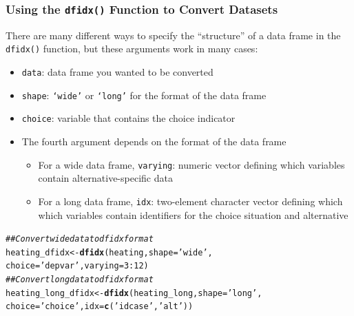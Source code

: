 \documentclass{beamer}\usepackage[]{graphicx}\usepackage[]{color}
\makeatletter
\newcommand{\hlnum}[1]{\textcolor[rgb]{0.686,0.059,0.569}{#1}}%
\newcommand{\hlstr}[1]{\textcolor[rgb]{0.192,0.494,0.8}{#1}}%
\newcommand{\hlcom}[1]{\textcolor[rgb]{0.678,0.584,0.686}{\textit{#1}}}%
\newcommand{\hlopt}[1]{\textcolor[rgb]{0,0,0}{#1}}%
\newcommand{\hlstd}[1]{\textcolor[rgb]{0.345,0.345,0.345}{#1}}%
\newcommand{\hlkwb}[1]{\textcolor[rgb]{0.69,0.353,0.396}{#1}}%
\newcommand{\hlkwc}[1]{\textcolor[rgb]{0.333,0.667,0.333}{#1}}%
\newcommand{\hlkwd}[1]{\textcolor[rgb]{0.737,0.353,0.396}{\textbf{#1}}}%
\newenvironment{kframe}{%
 \def\at@end@of@kframe{}%
 \ifinner\ifhmode%
  \def\at@end@of@kframe{\end{minipage}}%
  \begin{minipage}{\columnwidth}%
 \fi\fi%
 \def\FrameCommand##1{\hskip\@totalleftmargin \hskip-\fboxsep
 \colorbox{shadecolor}{##1}\hskip-\fboxsep
     \hskip-\linewidth \hskip-\@totalleftmargin \hskip\columnwidth}%
 \MakeFramed {\advance\hsize-\width
   \@totalleftmargin\z@ \linewidth\hsize
   \@setminipage}}%
 {\par\unskip\endMakeFramed%
 \at@end@of@kframe}
\newenvironment{knitrout}{}{} %
\makeatother
\begin{document}
\begin{frame}[fragile]\frametitle{Using the \texttt{dfidx()} Function to Convert Datasets}
    There are many different ways to specify the ``structure'' of a data frame in the \texttt{dfidx()} function, but these arguments work in many cases:
    \begin{itemize}
    	\item \texttt{data}: data frame you wanted to be converted
    	\item \texttt{shape}: \texttt{`wide'} or \texttt{`long'} for the format of the data frame
    	\item \texttt{choice}: variable that contains the choice indicator
    	\item The fourth argument depends on the format of the data frame
    	\begin{itemize}
    		\item For a wide data frame, \texttt{varying}: numeric vector defining which variables contain alternative-specific data
    		\item For a long data frame, \texttt{idx}: two-element character vector defining which which variables contain identifiers for the choice situation and alternative
    	\end{itemize}
    \end{itemize}
\begin{knitrout}\footnotesize
{}\color{fgcolor}\begin{kframe}
\begin{alltt}
\hlcom{## Convert wide data to dfidx format}
\hlstd{heating_dfidx} \hlkwb{<-} \hlkwd{dfidx}\hlstd{(heating,} \hlkwc{shape} \hlstd{=} \hlstr{'wide'}\hlstd{,}
                       \hlkwc{choice} \hlstd{=} \hlstr{'depvar'}\hlstd{,} \hlkwc{varying} \hlstd{=} \hlnum{3}\hlopt{:}\hlnum{12}\hlstd{)}
\hlcom{## Convert long data to dfidx format}
\hlstd{heating_long_dfidx} \hlkwb{<-} \hlkwd{dfidx}\hlstd{(heating_long,} \hlkwc{shape} \hlstd{=} \hlstr{'long'}\hlstd{,}
                            \hlkwc{choice} \hlstd{=} \hlstr{'choice'}\hlstd{,} \hlkwc{idx} \hlstd{=} \hlkwd{c}\hlstd{(}\hlstr{'idcase'}\hlstd{,} \hlstr{'alt'}\hlstd{))}
\end{alltt}
\end{kframe}
\end{knitrout}
\end{frame}
\end{document}
